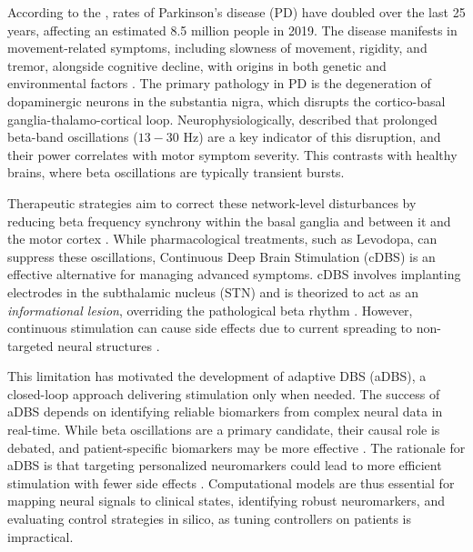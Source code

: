 \documentclass[12pt, letterpaper]{article}
\begin{document}
According to the \textcite{who_parkinson_2023}, rates of Parkinson's disease (PD) have doubled over the last 25 years, affecting an estimated 8.5 million people in 2019. The disease manifests in movement-related symptoms, including slowness of movement, rigidity, and tremor, alongside cognitive decline, with origins in both genetic and environmental factors \parencite{ben-shlomoEpidemiologyParkinsonsDisease2024}. The primary pathology in PD is the degeneration of dopaminergic neurons in the substantia nigra, which disrupts the cortico-basal ganglia-thalamo-cortical loop. Neurophysiologically, \textcite{tinkhauserBetaBurstDynamics2017} described that prolonged beta-band oscillations ($13-30$ Hz) are a key indicator of this disruption, and their power correlates with motor symptom severity. This contrasts with healthy brains, where beta oscillations are typically transient bursts.

Therapeutic strategies aim to correct these network-level disturbances by reducing beta frequency synchrony within the basal ganglia and between it and the motor cortex \parencite{tinkhauserBetaBurstDynamics2017, paulsCorticalBetaBurst2022}. While pharmacological treatments, such as Levodopa, can suppress these oscillations, Continuous Deep Brain Stimulation (cDBS) is an effective alternative for managing advanced symptoms. cDBS involves implanting electrodes in the subthalamic nucleus (STN) and is theorized to act as an \textit{informational lesion}, overriding the pathological beta rhythm \parencite{chikenMechanismDeepBrain2016, mcintyreNetworkPerspectivesMechanisms2010}. However, continuous stimulation can cause side effects due to current spreading to non-targeted neural structures \parencite{zarzyckiStimulationinducedSideEffects2020}.

This limitation has motivated the development of adaptive DBS (aDBS), a closed-loop approach delivering stimulation only when needed. The success of aDBS depends on identifying reliable biomarkers from complex neural data in real-time. While beta oscillations are a primary candidate, their causal role is debated, and patient-specific biomarkers may be more effective \parencite{swannGammaOscillationsHyperkinetic2016, wuComputationalModelsAdvance2024}. The rationale for aDBS is that targeting personalized neuromarkers could lead to more efficient stimulation with fewer side effects \parencite{littleAdaptiveDeepBrain2013}. Computational models are thus essential for mapping neural signals to clinical states, identifying robust neuromarkers, and evaluating control strategies in silico, as tuning controllers on patients is impractical.
\end{document}
